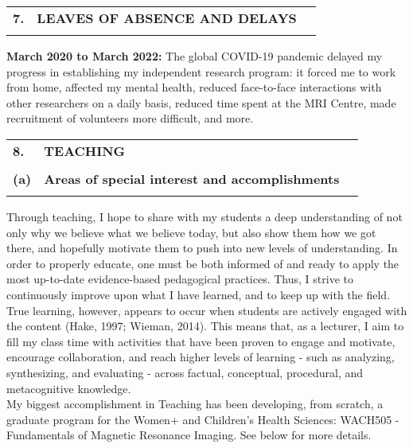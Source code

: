 \documentclass[11pt,notitlepage,english]{report}
\begin{document}

\vspace{5pt}
\begin{tabular}{L{.5cm} L{8cm} L{6.9cm}}
  \textbf{7.} & \textbf{LEAVES OF ABSENCE AND DELAYS} \\
  \\
\end{tabular}

\textbf{March 2020 to March 2022: }The global COVID-19 pandemic delayed my
progress in establishing my independent research program: it forced me to work
from home, affected my mental health, reduced face-to-face interactions with
other researchers on a daily basis, reduced time spent at the MRI Centre, made
recruitment of volunteers more difficult, and more.


\vspace{5pt}
\begin{tabular}{L{.5cm} L{12cm} L{6.9cm}}
  \textbf{8.}  & \textbf{TEACHING}                                      \\
  \\
  \textbf{(a)} & \textbf{Areas of special interest and accomplishments} \\
  \\
\end{tabular}
\label{8. Teaching}

Through teaching, I hope to share with my students a deep understanding of not only why we believe what we believe today, but also show them how we got there, and hopefully motivate them to push into new levels of understanding. In order to properly educate, one must be both informed of and ready to apply the most up-to-date evidence-based pedagogical practices. Thus, I strive to continuously improve upon what I have learned, and to keep up with the field. True learning, however, appears to occur when students are actively engaged with the content (Hake, 1997; Wieman, 2014). This means that, as a lecturer, I aim to fill my class time with activities that have been proven to engage and motivate, encourage collaboration, and reach higher levels of learning - such as analyzing, synthesizing, and evaluating - across factual, conceptual, procedural, and metacognitive knowledge.
\\

My biggest accomplishment in Teaching has been developing, from scratch, a graduate program for the Women+ and Children’s Health Sciences: WACH505 - Fundamentals of Magnetic Resonance Imaging. See below for more details.
\end{document}
